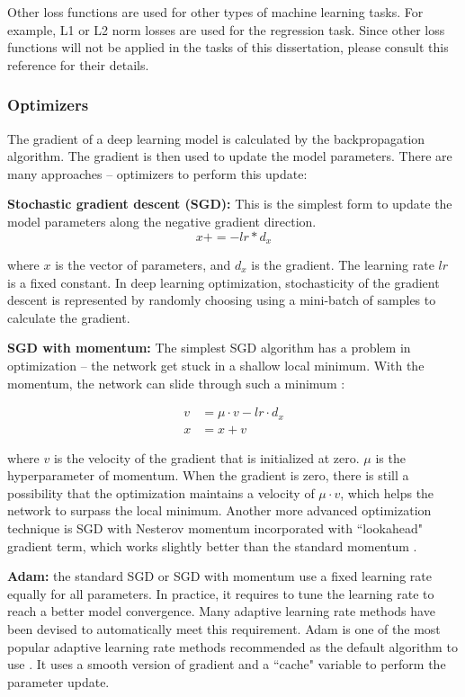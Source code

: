Other loss functions are used for other types of machine learning tasks. For example, L1 or L2 norm losses are used for the regression task. Since other loss functions will not be applied in the tasks of this dissertation, please consult this reference \cite{Stanforduniversity} for their details.

\subsubsection{Optimizers}

The gradient of a deep learning model is calculated by the backpropagation algorithm. The gradient is then used to update the model parameters. There are many approaches -- optimizers to perform this update:

\noindent\textbf{Stochastic gradient descent (SGD):} This is the simplest form to update the model parameters along the negative gradient direction. 
\begin{equation}
x += - lr * d_x
\end{equation}

where $x$ is the vector of parameters, and $d_x$ is the gradient. The learning rate $lr$ is a fixed constant. In deep learning optimization, stochasticity of the gradient descent is represented by randomly choosing using a mini-batch of samples to calculate the gradient.

\noindent\textbf{SGD with momentum:} The simplest SGD algorithm has a problem in optimization -- the network get stuck in a shallow local minimum. With the momentum, the network can slide through such a minimum \cite{MATLAB}:

\begin{align}
v &= \mu \cdot v - lr \cdot d_x \\
x &= x + v
\end{align}

where $v$ is the velocity of the gradient that is initialized at zero. $\mu$ is the hyperparameter of momentum. When the gradient is zero, there is still a possibility that the optimization maintains a velocity of $\mu \cdot v$, which helps the network to surpass the local minimum. Another more advanced optimization technique is SGD with Nesterov momentum incorporated with ``lookahead" gradient term, which works slightly better than the standard momentum \cite{Bengio2012}.

\noindent\textbf{Adam:} the standard SGD or SGD with momentum use a fixed learning rate equally for all parameters. In practice, it requires to tune the learning rate to reach a better model convergence. Many adaptive learning rate methods have been devised to automatically meet this requirement. Adam \cite{kingma2014adam} is one of the most popular adaptive learning rate methods recommended as the default algorithm to use \cite{Stanforduniversity}. It uses a smooth version of gradient and a ``cache" variable to perform the parameter update.

